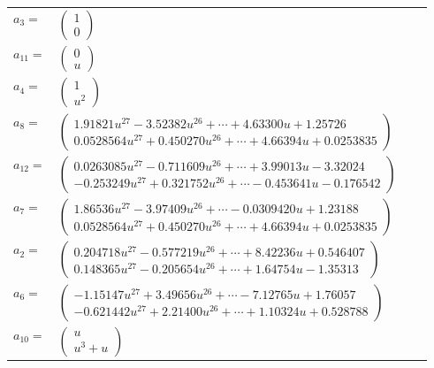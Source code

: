 \documentclass[1p]{elsarticle_modified}
\theoremstyle{definition}
\begin{document}
\begin{tabular}{m{7pt} m{180pt} m{7pt} m{180pt} }
\flushright $a_{3}=$&$\begin{pmatrix}1\\0\end{pmatrix}$ \\
\flushright $a_{11}=$&$\begin{pmatrix}0\\u\end{pmatrix}$ \\
\flushright $a_{4}=$&$\begin{pmatrix}1\\u^2\end{pmatrix}$ \\
\flushright $a_{8}=$&$\begin{pmatrix}1.91821 u^{27}-3.52382 u^{26}+\cdots+4.63300 u+1.25726\\0.0528564 u^{27}+0.450270 u^{26}+\cdots+4.66394 u+0.0253835\end{pmatrix}$ \\
\flushright $a_{12}=$&$\begin{pmatrix}0.0263085 u^{27}-0.711609 u^{26}+\cdots+3.99013 u-3.32024\\-0.253249 u^{27}+0.321752 u^{26}+\cdots-0.453641 u-0.176542\end{pmatrix}$ \\
\flushright $a_{7}=$&$\begin{pmatrix}1.86536 u^{27}-3.97409 u^{26}+\cdots-0.0309420 u+1.23188\\0.0528564 u^{27}+0.450270 u^{26}+\cdots+4.66394 u+0.0253835\end{pmatrix}$ \\
\flushright $a_{2}=$&$\begin{pmatrix}0.204718 u^{27}-0.577219 u^{26}+\cdots+8.42236 u+0.546407\\0.148365 u^{27}-0.205654 u^{26}+\cdots+1.64754 u-1.35313\end{pmatrix}$ \\
\flushright $a_{6}=$&$\begin{pmatrix}-1.15147 u^{27}+3.49656 u^{26}+\cdots-7.12765 u+1.76057\\-0.621442 u^{27}+2.21400 u^{26}+\cdots+1.10324 u+0.528788\end{pmatrix}$ \\
\flushright $a_{10}=$&$\begin{pmatrix}u\\u^3+u\end{pmatrix}$ \\

\end{tabular}
\end{document}
